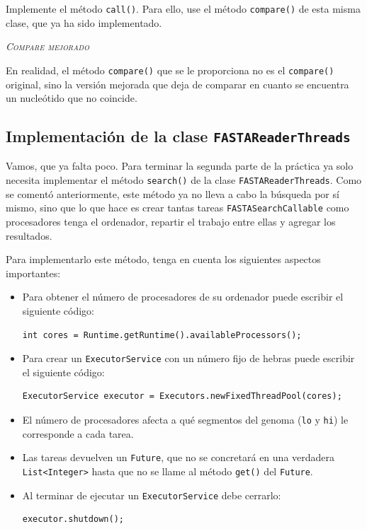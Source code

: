 \documentclass[10pt,a4paper,spanish]{article}
\newcommand{\sombreado}[2]{
  \begin{shaded}
    \begin{center} \emph{\textsc{#1}} \end{center}
    \noindent #2\\
  \end{shaded}
}
\newcommand{\code}[1]{\texttt{#1}}
\begin{document}
Implemente el método \code{call()}. Para ello, use el método \code{compare()} de esta misma clase, que ya ha sido implementado.

\sombreado{Compare mejorado}{En realidad, el método \code{compare()} que se le proporciona no es el \code{compare()} original, sino la versión mejorada que deja de comparar en cuanto se encuentra un nucleótido que no coincide.}

\subsection{Implementación de la clase \code{FASTAReaderThreads}}

Vamos, que ya falta poco. Para terminar la segunda parte de la práctica ya solo necesita implementar el método \code{search()} de la clase \code{FASTAReaderThreads}. Como se comentó anteriormente, este método ya no lleva a cabo la búsqueda por sí mismo, sino que lo que hace es crear tantas tareas \code{FASTASearchCallable} como procesadores tenga el ordenador, repartir el trabajo entre ellas y agregar los resultados.

Para implementarlo este método, tenga en cuenta los siguientes aspectos importantes:

\begin{itemize}
    \item Para obtener el número de procesadores de su ordenador puede escribir el siguiente código:

    \begin{verbatim}
int cores = Runtime.getRuntime().availableProcessors();
\end{verbatim}

    \item Para crear un \code{ExecutorService} con un número fijo de hebras puede escribir el siguiente código:

    \begin{verbatim}
ExecutorService executor = Executors.newFixedThreadPool(cores);
\end{verbatim}

    \item El número de procesadores afecta a qué segmentos del genoma (\code{lo} y \code{hi}) le corresponde a cada tarea.
    \item Las tareas devuelven un \code{Future}, que no se concretará en una verdadera \code{List<Integer>} hasta que no se llame al método \code{get()} del \code{Future}.
    \item Al terminar de ejecutar un \code{ExecutorService} debe cerrarlo:

    \begin{verbatim}
executor.shutdown();
\end{verbatim}

\end{itemize}
\end{document}
